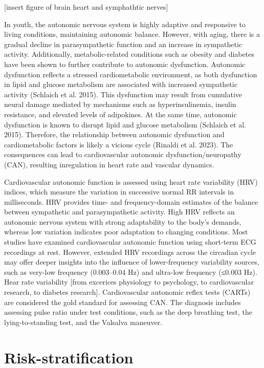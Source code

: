\documentclass[
  a4paper,
  headsepline=true,
  open=any]{scrbook}
\begin{document}
{[}insert figure of brain heart and symphathtic nerves{]}

In youth, the autonomic nervous system is highly adaptive and responsive
to living conditions, maintaining autonomic balance. However, with
aging, there is a gradual decline in parasympathetic function and an
increase in sympathetic activity. Additionally, metabolic-related
conditions such as obesity and diabetes have been shown to further
contribute to autonomic dysfunction. Autonomic dysfunction reflects a
stressed cardiometabolic environment, as both dysfunction in lipid and
glucose metabolism are associated with increased sympathetic activity
(Schlaich et al. 2015). This dysfunction may result from cumulative
neural damage mediated by mechanisms such as hyperinsulinemia, insulin
resistance, and elevated levels of adipokines. At the same time,
autonomic dysfunction is known to disrupt lipid and glucose metabolism
(Schlaich et al. 2015). Therefore, the relationship between autonomic
dysfunction and cardiometabolic factors is likely a vicious cycle
(Rinaldi et al. 2023). The consequences can lead to cardiovascular
autonomic dysfunction/neuropathy (CAN), resulting inregulation in heart
rate and vascular dynamics.

Cardiovascular autonomic function is assessed using heart rate
variability (HRV) indices, which measure the variation in successive
normal RR intervals in milliseconds. HRV provides time- and
frequency-domain estimates of the balance between sympathetic and
parasympathetic activity. High HRV reflects an autonomic nervous system
with strong adaptability to the body's demands, whereas low variation
indicates poor adaptation to changing conditions. Most studies have
examined cardiovascular autonomic function using short-term ECG
recordings at rest. However, extended HRV recordings across the
circadian cycle may offer deeper insights into the influence of
lower-frequency variability sources, such as very-low frequency
(0.003--0.04 Hz) and ultra-low frequency (≤0.003 Hz). Hear rate
variability {[}from excerices physiology to psychology, to
cardiovascular research, to diabetes research{]}. Cardiovascular
autonomic reflex tests (CARTs) are considered the gold standard for
assessing CAN. The diagnosis includes assessing pulse ratio under test
conditions, such as the deep breathing test, the lying-to-standing test,
and the Valsalva maneuver.


\hypertarget{risk-stratification}{%
\chapter{Risk-stratification}\label{risk-stratification}}
\end{document}
